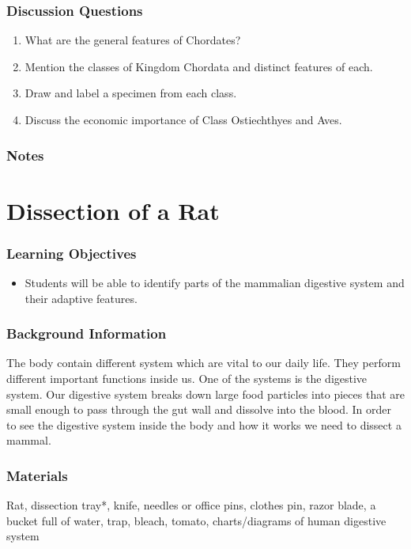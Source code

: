 \subsubsection*{Discussion Questions}
\begin{enumerate}
\item{What are the general features of Chordates?}
\item{Mention the classes of Kingdom Chordata and distinct features of each.}
\item{Draw and label a specimen from each class.}
\item{Discuss the economic importance of Class Ostiechthyes and Aves.}
\end{enumerate}

\subsubsection*{Notes}



\section{Dissection of a Rat}

\subsubsection*{Learning Objectives}
\begin{itemize}
\item{Students will be able to identify parts of the mammalian digestive system and their adaptive features.}
\end{itemize}

\subsubsection*{Background Information}
The body contain different system which are vital to our daily life. They perform different important functions inside us. One of the systems is the digestive system. Our digestive system breaks down large food particles into pieces that are small enough to pass through the gut wall and dissolve into the blood. In order to see the digestive system inside the body and how it works we need to dissect a mammal.

\subsubsection*{Materials}
Rat, dissection tray*, knife, needles or office pins, clothes pin, razor blade, a bucket full of water, trap, bleach, tomato, charts/diagrams of human digestive system

